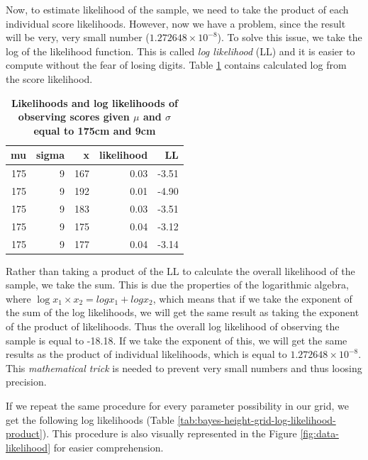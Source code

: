 \documentclass[
]{book}
\begin{document}
Now, to estimate likelihood of the sample, we need to take the product of each individual score likelihoods. However, now we have a problem, since the result will be very, very small number (\ensuremath{1.272648\times 10^{-8}}). To solve this issue, we take the log of the likelihood function. This is called \emph{log likelihood} (LL) and it is easier to compute without the fear of losing digits. Table \ref{tab:bayes-height-grid-log-likelihood} contains calculated log from the score likelihood.



\begin{table}

\caption{\label{tab:bayes-height-grid-log-likelihood}\textbf{Likelihoods and log likelihoods of observing scores given \(\mu\) and \(\sigma\) equal to 175cm and 9cm}}
\centering
\begin{tabular}[t]{rrrrr}
\toprule
mu & sigma & x & likelihood & LL\\
\midrule
175 & 9 & 167 & 0.03 & -3.51\\
175 & 9 & 192 & 0.01 & -4.90\\
175 & 9 & 183 & 0.03 & -3.51\\
175 & 9 & 175 & 0.04 & -3.12\\
175 & 9 & 177 & 0.04 & -3.14\\
\bottomrule
\end{tabular}
\end{table}

Rather than taking a product of the LL to calculate the overall likelihood of the sample, we take the sum. This is due the properties of the logarithmic algebra, where \(\log{x_1\times x_2} = log{x_1} + log{x_2}\), which means that if we take the exponent of the sum of the log likelihoods, we will get the same result as taking the exponent of the product of likelihoods. Thus the overall log likelihood of observing the sample is equal to -18.18. If we take the exponent of this, we will get the same results as the product of individual likelihoods, which is equal to \ensuremath{1.272648\times 10^{-8}}. This \emph{mathematical trick} is needed to prevent very small numbers and thus loosing precision.

If we repeat the same procedure for every parameter possibility in our grid, we get the following log likelihoods (Table \ref{tab:bayes-height-grid-log-likelihood-product}). This procedure is also visually represented in the Figure \ref{fig:data-likelihood} for easier comprehension.
\end{document}

